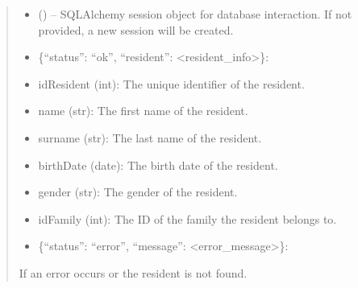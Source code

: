 \documentclass[letterpaper,10pt,english]{sphinxmanual}
\begin{document}
\begin{fulllineitems}
\begin{fulllineitems}
\begin{quote}
\begin{description}
\begin{itemize}
\item {} 
\sphinxAtStartPar
{} (\sphinxstyleliteralemphasis{\sphinxupquote{, }}) – SQLAlchemy session object for database interaction.
If not provided, a new session will be created.

\end{itemize}

\sphinxAtStartPar
\begin{description}
\begin{itemize}
\item {} 
\sphinxAtStartPar
\{“status”: “ok”, “resident”: <resident\_info>\}:

\end{itemize}
\begin{description}
\begin{itemize}
\item {} 
\sphinxAtStartPar
idResident (int): The unique identifier of the resident.

\item {} 
\sphinxAtStartPar
name (str): The first name of the resident.

\item {} 
\sphinxAtStartPar
surname (str): The last name of the resident.

\item {} 
\sphinxAtStartPar
birthDate (date): The birth date of the resident.

\item {} 
\sphinxAtStartPar
gender (str): The gender of the resident.

\item {} 
\sphinxAtStartPar
idFamily (int): The ID of the family the resident belongs to.

\end{itemize}

\end{description}
\begin{itemize}
\item {} 
\sphinxAtStartPar
\{“status”: “error”, “message”: <error\_message>\}:

\end{itemize}

\sphinxAtStartPar
If an error occurs or the resident is not found.


\end{description}
\end{description}
\end{quote}
\end{fulllineitems}
\end{fulllineitems}
\end{document}
